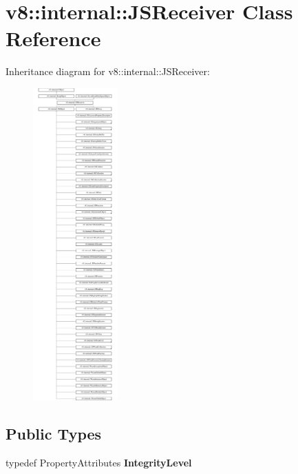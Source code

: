 \hypertarget{classv8_1_1internal_1_1JSReceiver}{}\section{v8\+:\+:internal\+:\+:J\+S\+Receiver Class Reference}
\label{classv8_1_1internal_1_1JSReceiver}
Inheritance diagram for v8\+:\+:internal\+:\+:J\+S\+Receiver\+:\begin{figure}[H]
\begin{center}
\leavevmode
\includegraphics[height=12.000000cm]{classv8_1_1internal_1_1JSReceiver}
\end{center}
\end{figure}
\subsection*{Public Types}
\begin{DoxyCompactItemize}
\item 
\mbox{\label{classv8_1_1internal_1_1JSReceiver_a974073862647b1b3ef029763f9e6fa2c}} 
typedef Property\+Attributes {\bfseries Integrity\+Level}
\end{DoxyCompactItemize}
